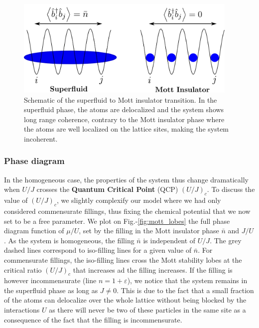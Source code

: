 \begin{figure}
    \centering
    \includegraphics[width=0.95\textwidth]{Fig/Chapter2/schema_superfluid_mott.png}
    \caption{Schematic of the superfluid to Mott insulator transition. In the superfluid phase, the atoms are delocalized and the system shows long range coherence, contrary to the Mott insulator phase where the atoms are well localized on the lattice sites, making the system incoherent.}
    \label{fig:my_label}
\end{figure}

\subsubsection{Phase diagram}

In the homogeneous case, the properties of the system thus change dramatically when $U/J$ crosses the \textbf{Quantum Critical Point} (QCP) $(U/J)_c$. To discuss the value of $(U/J)_c$, we slightly complexify our model where we had only considered commensurate fillings, thus fixing the chemical potential that we now set to be a free parameter. We plot on Fig.-\ref{fig:mott_lobes} the full phase diagram function of $\mu/U$, set by the filling in the Mott insulator phase $\bar{n}$ and $J/U$. As the system is homogeneous, the filling $\bar{n}$ is independent of $U/J$. The grey dashed lines correspond to iso-filling lines for a given value of $\bar{n}$. For commensurate fillings, the iso-filling lines cross the Mott stability lobes at the critical ratio $(U/J)_c$ that increases ad the filling increases. If the filling is however incommensurate (line $n=1+\varepsilon$), we notice that the system remains in the superfluid phase as long as $J \neq 0$. This is due to the fact that a small fraction of the atoms can delocalize over the whole lattice without being blocked by the interactions $U$ as there will never be two of these particles in the same site as a consequence of the fact that the filling is incommensurate.

